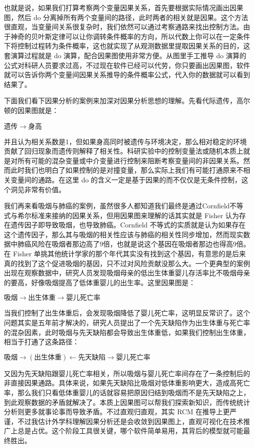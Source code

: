 \documentclass[]{tufte-book}
\begin{document}
也就是说，如果我们打算考察两个变量因果关系，首先要根据实际情况画出因果图，然后 do 分离掉所有两个变量间的路径，此时两者的相关就是因果。这个方法很直观，当变量间关系很复杂时，我们依然可以通过考察通路来找出控制方法。由于神奇的贝叶斯定律可以让你调转条件概率的方向，所以代数上你可以在一定条件下将控制过程转为条件概率，这也就实现了从观测数据里提取因果关系的目的，这套演算过程就是 do 演算，配合因果图使用非常方便。从图里手工推导 do 演算的公式对科研人员要求过高，不过现在软件已经可以代劳，你只要画出因果图，软件就可以告诉你两个变量间因果关系推导的条件概率公式，代入你的数据就可以看到结果了。

下面我们看下因果分析的案例来加深对因果分析思想的理解。先看代际遗传，高尔顿的因果图就是：

\(遗传 \rightarrow 身高\)

并且认为相关系数是1，但如果身高同时被遗传与环境决定，那么相对稳定的环境贡献了回归现象而遗传则解释了相关性。科研实验中的控制变量法或随机本质上就是对所有可能的混杂变量或中介变量进行控制来阻断考察变量间的非因果关系。然而此时我们也明白了如果控制的是对撞变量，那么实际上我们有可能打通原来不相关变量间的通路。在这里 do 的含义一定是基于因果的而不仅仅是无条件控制，这个洞见非常有价值。

我们再来看吸烟与肺癌的案例，虽然很多人都知道我们最终是通过Cornfield不等式与希尔标准来接纳的因果关系，但用因果图来理解的话其实就是 Fisher 认为存在遗传因子即导致吸烟，也导致肺癌。Cornfield 不等式的实质就是认为如果存在这个遗传因子，那么其与吸烟的相关性应该与肺癌的相关性同步增加，然而现实数据中肺癌风险在吸烟者那边高了9倍，也就是说这个基因在吸烟者那边也得高9倍。在 Fisher 单挑其他统计学家的那个年代其实没有找到这个基因，有意思的是后来真的找到了这个促进吸烟的基因，只不过对风险贡献没那么大。一个更典型的案例出现在观察数据中，研究人员发现吸烟母亲的低出生体重婴儿存活率比不吸烟母亲的要高，好像吸烟提高了低体重婴儿的出生率。这里因果图是：

\(吸烟 \rightarrow 出生体重 \rightarrow 婴儿死亡率\)

当我们控制了出生体重后，会发现吸烟降低了婴儿死亡率，这明显反常识了。这个问题其实是五年前才解决的，研究人员提出了一个先天缺陷作为出生体重与死亡率的混杂因素，此时吸烟与先天缺陷都会导致出生体重低，如果我们控制出生体重，相当于打通了这条路径：

\(吸烟 \rightarrow (出生体重) \leftarrow 先天缺陷 \rightarrow 婴儿死亡率\)

又因为先天缺陷跟婴儿死亡率相关，所以吸烟与婴儿死亡率间存在了一条控制后的非直接因果通路。具体来说，如果先天缺陷比吸烟对低体重影响更大，造成高死亡率，那么我们只看低体重婴儿的话就容易把原因归结到吸烟而不是先天缺陷之上，到此观察数据的矛盾就解决了。本质上因果图可以帮我们探索新知识，而传统统计分析则更多就事论事而导致矛盾。不过直观归直观，其实 RCM 在推导上更严谨，不过我估计外学科理解因果分析还是会收敛到因果图上，直观可视化在技术推广上总是占优。这个阶段工具很关键，哪个软件简单易用，其背后的模型就可能最终胜出。
\end{document}
